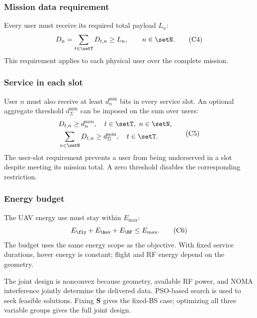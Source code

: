 \subsubsection{Mission data requirement}
Every user must receive its required total payload $L_n$:
\begin{equation}
D_n=\sum_{t\in\setT}D_{t,n}\ge L_n,\qquad n\in\setN.
\tag{C4}\label{eq:c_payload}
\end{equation}
This requirement applies to each physical user over the complete mission.

\subsubsection{Service in each slot}
User $n$ must also receive at least $d_n^{\min}$ bits in every service slot. An optional aggregate threshold $d_{\Sigma}^{\min}$ can be imposed on the sum over users:
\begin{equation}
\begin{aligned}
&D_{t,n}\ge d_n^{\min},\quad t\in\setT,\ n\in\setN,\\
&\sum_{n\in\setN}D_{t,n}\ge d_{\Sigma}^{\min},\quad t\in\setT.
\end{aligned}
\tag{C5}\label{eq:c_user_slot}
\end{equation}
The user-slot requirement prevents a user from being underserved in a slot despite meeting its mission total. A zero threshold disables the corresponding restriction.

\subsubsection{Energy budget}
The UAV energy use must stay within $E_{\max}$:
\begin{equation}
E_{\fly}+E_{\hov}+E_{\RF}\le E_{\max}.
\tag{C6}\label{eq:c_budget}
\end{equation}
The budget uses the same energy scope as the objective. With fixed service durations, hover energy is constant; flight and RF energy depend on the geometry.

The joint design is nonconvex because geometry, available RF power, and NOMA interference jointly determine the delivered data. PSO-based search is used to seek feasible solutions. Fixing $\bm S$ gives the fixed-BS case; optimizing all three variable groups gives the full joint design.
